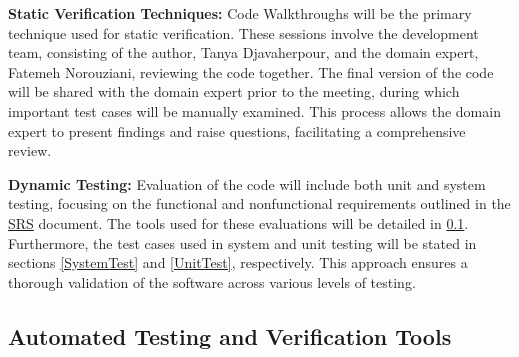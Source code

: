 \documentclass[12pt, titlepage]{article}
\begin{document}
\begin{inparaitem}
  \item \textbf{Static Verification Techniques:}
  Code Walkthroughs will be the primary technique used for static verification. 
  These sessions involve the development team, consisting of the author, Tanya Djavaherpour, 
  and the domain expert, Fatemeh Norouziani, reviewing the code together. 
  The final version of the code will be shared with the domain expert prior 
  to the meeting, during which important test cases will be manually examined. 
  This process allows the domain expert to present findings and raise questions, 
  facilitating a comprehensive review.

  \item \textbf{Dynamic Testing:}
  Evaluation of the code will include both unit and system testing, focusing on 
  the functional and nonfunctional requirements outlined in the
  \href{https://github.com/tanya-jp/ANN-CAS741/blob/main/docs/SRS/SRS.pdf}{SRS} document.
  The tools used for these evaluations will be detailed in \ref{AutoTestVerTools}. Furthermore, the test cases 
  used in system and unit testing will be stated in sections \ref{SystemTest} and \ref{UnitTest}, respectively.
  This approach ensures a thorough validation of the software across various levels of testing.

\end{inparaitem}



\subsection{Automated Testing and Verification Tools}\label{AutoTestVerTools}

\end{document}
